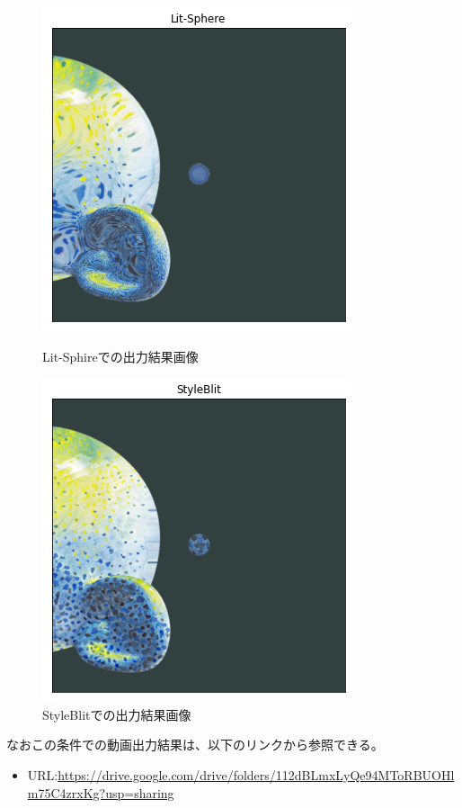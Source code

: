 \documentclass[dvipdfmx]{jsarticle}
\begin{document}
\begin{figure}[H]
 \begin{minipage}{0.5\hsize}
  \begin{center}
   \includegraphics[scale=0.4]{images/suzzanne_lit_out1.png}
  \end{center}
  \caption{Lit-Sphireでの出力結果画像}
 \end{minipage}
 \begin{minipage}{0.5\hsize}
  \begin{center}
   \includegraphics[scale=0.4]{images/suzzanne_style_out1.png}
  \end{center}
  \caption{StyleBlitでの出力結果画像}
 \end{minipage}
\end{figure}
なおこの条件での動画出力結果は、以下のリンクから参照できる。
\begin{itemize}
  \item URL:\url{https://drive.google.com/drive/folders/112dBLmxLyQe94MToRBUOHlm75C4zrxKg?usp=sharing}
\end{itemize}
\end{document}

